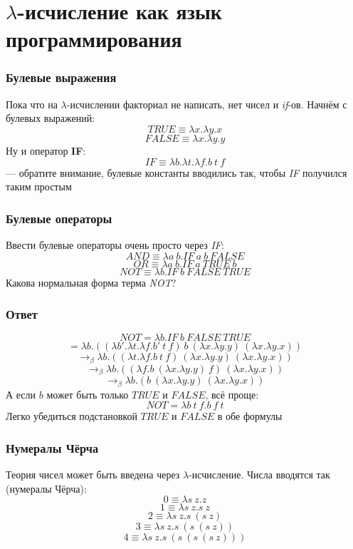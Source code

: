 \documentclass{../../slides-style}
\begin{document}
    \section{$\lambda$-исчисление как язык программирования}

    \begin{frame}
        \frametitle{Булевые выражения}
        Пока что на $\lambda$-исчислении факториал не написать, нет чисел и \textit{if}-ов. Начнём с булевых выражений:
        $$TRUE \equiv \lambda x.\lambda y.x$$
        $$FALSE \equiv \lambda x.\lambda y.y$$
        Ну и оператор \textbf{IF}:
        $$IF \equiv \lambda b.\lambda t.\lambda f.b\ t\ f$$
        --- обратите внимание, булевые константы вводились так, чтобы \textit{IF} получился таким простым
    \end{frame}

    \begin{frame}
        \frametitle{Булевые операторы}
        Ввести булевые операторы очень просто через \textit{IF}:
        $$AND \equiv \lambda a\ b. IF\ a\ b\ FALSE$$
        $$OR \equiv \lambda a\ b. IF\ a\ TRUE\ b$$
        $$NOT \equiv \lambda b.IF\ b\ FALSE\ TRUE$$
        Какова нормальная форма терма \textit{NOT}?
    \end{frame}

    \begin{frame}
        \frametitle{Ответ}
        $$NOT = \lambda b.IF\ b\ FALSE\ TRUE$$
        $$= \lambda b.((\lambda b'.\lambda t.\lambda f.b'\ t\ f)\ b\ (\lambda x.\lambda y.y)\ (\lambda x.\lambda y.x))$$
        $$\rightarrow_\beta \lambda b.((\lambda t.\lambda f.b\ t\ f)\ (\lambda x.\lambda y.y)\ (\lambda x.\lambda y.x))$$
        $$\rightarrow_\beta \lambda b.((\lambda f.b\ (\lambda x.\lambda y.y)\ f)\ (\lambda x.\lambda y.x))$$
        $$\rightarrow_\beta \lambda b.(b\ (\lambda x.\lambda y.y)\ (\lambda x.\lambda y.x))$$
        А если $b$ может быть только $TRUE$ и $FALSE$, всё проще:
        $$NOT = \lambda b\ t\ f.b\ f\ t$$
        Легко убедиться подстановкой $TRUE$ и $FALSE$ в обе формулы
    \end{frame}

    \begin{frame}
        \frametitle{Нумералы Чёрча}
        Теория чисел может быть введена через $\lambda$-исчисление. Числа вводятся так (нумералы Чёрча):
        $$0 \equiv \lambda s\ z.z$$
        $$1 \equiv \lambda s\ z.s\ z$$
        $$2 \equiv \lambda s\ z.s\ (s\ z)$$
        $$3 \equiv \lambda s\ z.s\ (s\ (s\ z))$$
        $$4 \equiv \lambda s\ z.s\ (s\ (s\ (s\ z)))$$
    \end{frame}
\end{document}
